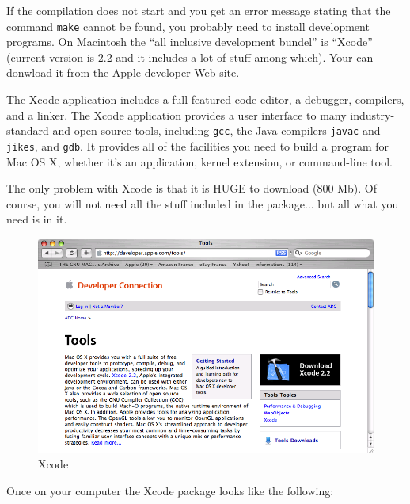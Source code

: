 \bigskip
\noindent If the compilation does not start and you get an error message
stating that the command \verb+make+ cannot be found, you probably need to
install development programs. On Macintosh the ``all inclusive development
bundel'' is ``Xcode'' (current version is 2.2 and it includes a lot
of stuff among which). Your can donwload it from the Apple developer Web site.

\bigskip
\noindent The Xcode application includes a full-featured code editor, a debugger, 
compilers, and a linker. The Xcode application provides a user interface to many 
industry-standard and open-source tools, including \verb+gcc+, the Java compilers
\verb+javac+ and \verb+jikes+, and \verb+gdb+. It provides all of the facilities you
need to build a program for Mac OS X, whether it's an application, kernel
extension, or command-line tool.

\bigskip
\noindent The only problem with Xcode is that it is HUGE to download (800 Mb).
Of course, you will not need all the stuff included in the package... but all
what you need is in it.

\begin{figure}[!h]
\begin{center}
\includegraphics[width=15cm]{resources/img/fig-mac4.png}
\caption{Xcode\label{fig-mac4}}
\end{center}
\end{figure}


\bigskip
\noindent Once on your computer the Xcode package looks like the following:

